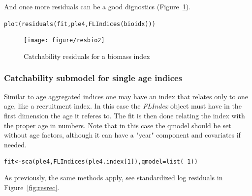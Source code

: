 \documentclass[a4paper,english,10pt]{article}\usepackage[]{graphicx}\usepackage[]{color}
\makeatletter
\newcommand{\hlnum}[1]{\textcolor[rgb]{0.2,0.2,0.2}{#1}}%
\newcommand{\hlopt}[1]{\textcolor[rgb]{0.2,0.2,0.2}{#1}}%
\newcommand{\hlstd}[1]{\textcolor[rgb]{0,0,0}{#1}}%
\newcommand{\hlkwb}[1]{\textcolor[rgb]{0.361,0.506,0.596}{#1}}%
\newcommand{\hlkwc}[1]{\textcolor[rgb]{0.361,0.506,0.596}{#1}}%
\newcommand{\hlkwd}[1]{\textcolor[rgb]{0.361,0.506,0.596}{#1}}%
\newenvironment{kframe}{%
 \def\at@end@of@kframe{}%
 \ifinner\ifhmode%
  \def\at@end@of@kframe{\end{minipage}}%
  \begin{minipage}{\columnwidth}%
 \fi\fi%
 \def\FrameCommand##1{\hskip\@totalleftmargin \hskip-\fboxsep
 \colorbox{shadecolor}{##1}\hskip-\fboxsep
     \hskip-\linewidth \hskip-\@totalleftmargin \hskip\columnwidth}%
 \MakeFramed {\advance\hsize-\width
   \@totalleftmargin\z@ \linewidth\hsize
   \@setminipage}}%
 {\par\unskip\endMakeFramed%
 \at@end@of@kframe}
\newenvironment{knitrout}{}{} %
\newcommand{\class}[1]{{\textit{#1}}}
\makeatother
\begin{document}
And once more residuals can be a good dignostics (Figure~\ref{fig:resbio2}).

\begin{knitrout}
\color{fgcolor}\begin{kframe}
\begin{alltt}
\hlkwd{plot}\hlstd{(}\hlkwd{residuals}\hlstd{(fit, ple4,} \hlkwd{FLIndices}\hlstd{(bioidx)))}
\end{alltt}
\end{kframe}\begin{figure}[H]


{\centering \texttt{[image: figure/resbio2]} 

}

\caption[Catchability residuals for a biomass index]{Catchability residuals for a biomass index\label{fig:resbio2}}
\end{figure}


\end{knitrout}

\subsubsection{Catchability submodel for single age indices}

Similar to age aggregated indices one may have an index that relates only to one age, like a recruitment index. In this case the \class{FLIndex} object must have in the first dimension the age it referes to. The fit is then done relating the index with the proper age in numbers. Note that in this case the qmodel should be set without age factors, although it can have a "year" component and covariates if needed.

\begin{knitrout}
\color{fgcolor}\begin{kframe}
\begin{alltt}
\hlstd{fit} \hlkwb{<-} \hlkwd{sca}\hlstd{(ple4,} \hlkwd{FLIndices}\hlstd{(ple4.index[}\hlnum{1}\hlstd{]),} \hlkwc{qmodel}\hlstd{=}\hlkwd{list}\hlstd{(}\hlopt{~}\hlnum{1}\hlstd{))}
\end{alltt}
\end{kframe}
\end{knitrout}

As previously, the same methods apply, see standardized log residuals in Figure~\ref{fig:resrec}.
\end{document}
